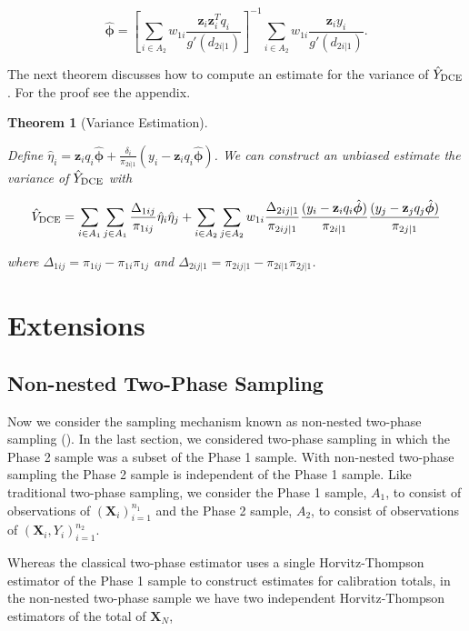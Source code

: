 \documentclass[12pt]{article}
\newtheorem{theorem}{Theorem}
\renewcommand{\bf}[1]{\mathbf{#1}}
\begin{document}
$$
\hat{\bm \phi} = 
\left[\sum_{i \in A_2} 
w_{1i}\frac{\bf z_i \bf z_i^T q_i}{g'(d_{2i|1})}\right]^{-1}
\sum_{i \in A_2} w_{1i}\frac{\bf z_i y_i}{g'(d_{2i|1})}.
$$

The next theorem discusses how to compute an estimate for the variance of 
$\hat Y_{\rm DCE}$. For the proof see the appendix.

\begin{theorem}[Variance Estimation]\label{thm:mainvar}

  Define $\hat \eta_i = \bf z_i q_i \hat{\bm \phi} + 
  \frac{\delta_i}{\pi_{2i|1}}(y_i - \bf z_i q_i \hat{\bm \phi})$.
  We can construct an unbiased estimate the variance of $\hat Y_{\rm DCE}$ with

  $$
  \hat V_{\rm DCE} 
  = \sum_{i \in A_1} \sum_{j \in A_1} \frac{\Delta_{1ij}}{\pi_{1ij}} 
  \hat \eta_i \hat \eta_j
  + \sum_{i \in A_2} \sum_{j \in A_2} w_{1i} \frac{\Delta_{2ij|1}}{\pi_{2ij|1}} 
  \frac{(y_i - \bf z_i q_i \hat{\bm \phi})}{\pi_{2i|1}}
  \frac{(y_j - \bf z_j q_j \hat{\bm \phi})}{\pi_{2j|1}}
  $$

  where $\Delta_{1ij} = \pi_{1ij} - \pi_{1i}\pi_{1j}$ and 
  $\Delta_{2ij|1} = \pi_{2ij|1} - \pi_{2i|1}\pi_{2j|1}$.

\end{theorem}

\section{Extensions}

\subsection{Non-nested Two-Phase Sampling}

Now we consider the sampling mechanism known as non-nested two-phase sampling 
(\cite{hidiroglou2001double}). In the last section, we considered two-phase sampling
in which the Phase 2 sample was a subset of the Phase 1 sample. With non-nested
two-phase sampling the Phase 2 sample is independent of the Phase 1 sample. 
Like traditional two-phase sampling, we consider the Phase 1 sample, $A_1$, to
consist of observations of $(\bf X_i)_{i = 1}^{n_1}$ and the Phase 2 sample,
$A_2$, to consist of observations of $(\bf X_i, Y_i)_{i = 1}^{n_2}$. 

Whereas the classical two-phase estimator uses a single Horvitz-Thompson
estimator of the Phase 1 sample to construct estimates for calibration totals,
in the non-nested two-phase sample we have two independent Horvitz-Thompson
estimators of the total of $\bf X_N$,
\end{document}
